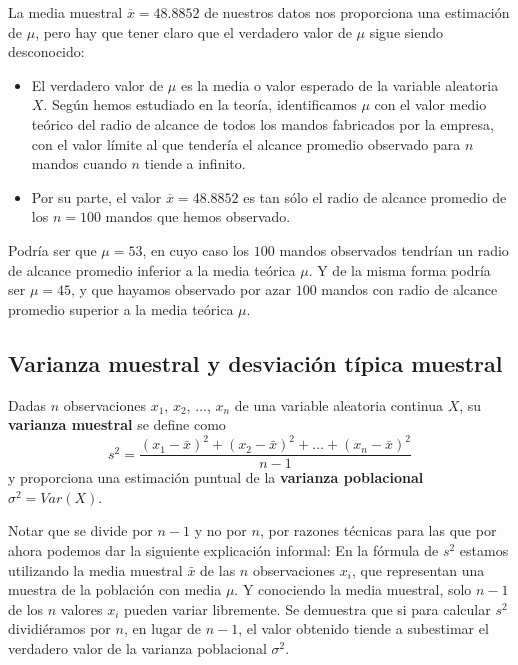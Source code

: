 \documentclass[
  degree=mecinf,
  title=normal,
  toc=normal,
  bib=normal]{mnye}
\providecommand{\tightlist}{%
  \setlength{\itemsep}{0pt}\setlength{\parskip}{0pt}}
\begin{document}
La media muestral \(\overline{x} = 48.8852\) de nuestros datos nos proporciona una estimación de \(\mu\), pero hay que tener claro que el verdadero valor de \(\mu\) sigue siendo desconocido:

\begin{itemize}
\tightlist
\item
  El verdadero valor de \(\mu\) es la media o valor esperado de la variable aleatoria \(X\). Según hemos estudiado en la teoría, identificamos \(\mu\) con el valor medio teórico del radio de alcance de todos los mandos fabricados por la empresa, con el valor límite al que tendería el alcance promedio observado para \(n\) mandos cuando \(n\) tiende a infinito.\\
\item
  Por su parte, el valor \(\overline{x} = 48.8852\) es tan sólo el radio de alcance promedio de los \(n=100\) mandos que hemos observado.
\end{itemize}

Podría ser que \(\mu=53\), en cuyo caso los \(100\) mandos observados tendrían un radio de alcance promedio inferior a la media teórica \(\mu\). Y de la misma forma podría ser \(\mu=45\), y que hayamos observado por azar \(100\) mandos con radio de alcance promedio superior a la media teórica \(\mu\).

\hypertarget{sd}{%
\subsection{Varianza muestral y desviación típica muestral}\label{sd}}

Dadas \(n\) observaciones \(x_1\), \(x_2\), \(\dots\), \(x_n\) de una variable aleatoria continua \(X\), su \textbf{varianza muestral} se define como
\[
    s^2 = \frac{(x_1-\bar{x})^2 + (x_2-\bar{x})^2 + \dots + (x_n-\bar{x})^2}{n-1}
\]
y proporciona una estimación puntual de la \textbf{varianza poblacional} \(\sigma^2 = Var(X)\).

Notar que se divide por \(n-1\) y no por \(n\), por razones técnicas para las que por ahora podemos dar la siguiente explicación informal: En la fórmula de \(s^2\) estamos utilizando la media muestral \(\bar x\) de las \(n\) observaciones \(x_i\), que representan una muestra de la población con media \(\mu\). Y conociendo la media muestral, solo \(n-1\) de los \(n\) valores \(x_i\) pueden variar libremente. Se demuestra que si para calcular \(s^2\) dividiéramos por \(n\), en lugar de \(n-1\), el valor obtenido tiende a subestimar el verdadero valor de la varianza poblacional \(\sigma^2\).
\end{document}
